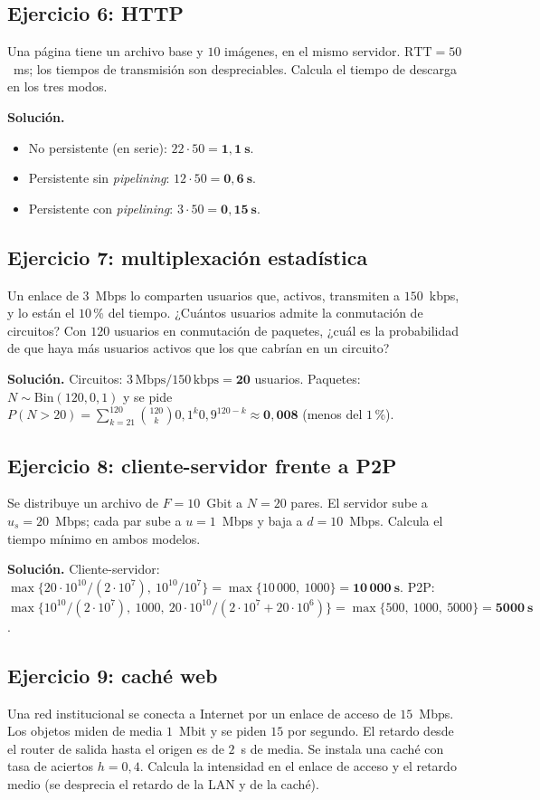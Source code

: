 \documentclass[11pt,a4paper]{article}
\begin{document}
\subsection*{Ejercicio 6: HTTP}
Una página tiene un archivo base y $10$ imágenes, en el mismo servidor. $\text{RTT}=50$~ms; los tiempos de transmisión son despreciables. Calcula el tiempo de descarga en los tres modos.

\textbf{Solución.}
\begin{itemize}
  \item No persistente (en serie): $22\cdot50=\mathbf{1{,}1~s}$.
  \item Persistente sin \emph{pipelining}: $12\cdot50=\mathbf{0{,}6~s}$.
  \item Persistente con \emph{pipelining}: $3\cdot50=\mathbf{0{,}15~s}$.
\end{itemize}

\subsection*{Ejercicio 7: multiplexación estadística}
Un enlace de $3$~Mbps lo comparten usuarios que, activos, transmiten a $150$~kbps, y lo están el $10$\,\% del tiempo. ¿Cuántos usuarios admite la conmutación de circuitos? Con $120$ usuarios en conmutación de paquetes, ¿cuál es la probabilidad de que haya más usuarios activos que los que cabrían en un circuito?

\textbf{Solución.} Circuitos: $3\,\text{Mbps}/150\,\text{kbps}=\mathbf{20}$ usuarios. Paquetes: $N\sim\text{Bin}(120,0{,}1)$ y se pide $P(N>20)=\sum_{k=21}^{120}\binom{120}{k}0{,}1^{k}0{,}9^{120-k}\approx\mathbf{0{,}008}$ (menos del $1$\,\%).

\subsection*{Ejercicio 8: cliente-servidor frente a P2P}
Se distribuye un archivo de $F=10$~Gbit a $N=20$ pares. El servidor sube a $u_s=20$~Mbps; cada par sube a $u=1$~Mbps y baja a $d=10$~Mbps. Calcula el tiempo mínimo en ambos modelos.

\textbf{Solución.} Cliente-servidor: $\max\{20\cdot10^{10}/(2\cdot10^{7}),\ 10^{10}/10^{7}\}=\max\{10\,000,\ 1000\}=\mathbf{10\,000~s}$.
P2P: $\max\{10^{10}/(2\cdot10^{7}),\ 1000,\ 20\cdot10^{10}/(2\cdot10^{7}+20\cdot10^{6})\}=\max\{500,\ 1000,\ 5000\}=\mathbf{5000~s}$.

\subsection*{Ejercicio 9: caché web}
Una red institucional se conecta a Internet por un enlace de acceso de $15$~Mbps. Los objetos miden de media $1$~Mbit y se piden $15$ por segundo. El retardo desde el router de salida hasta el origen es de $2$~s de media. Se instala una caché con tasa de aciertos $h=0{,}4$. Calcula la intensidad en el enlace de acceso y el retardo medio (se desprecia el retardo de la LAN y de la caché).
\end{document}
